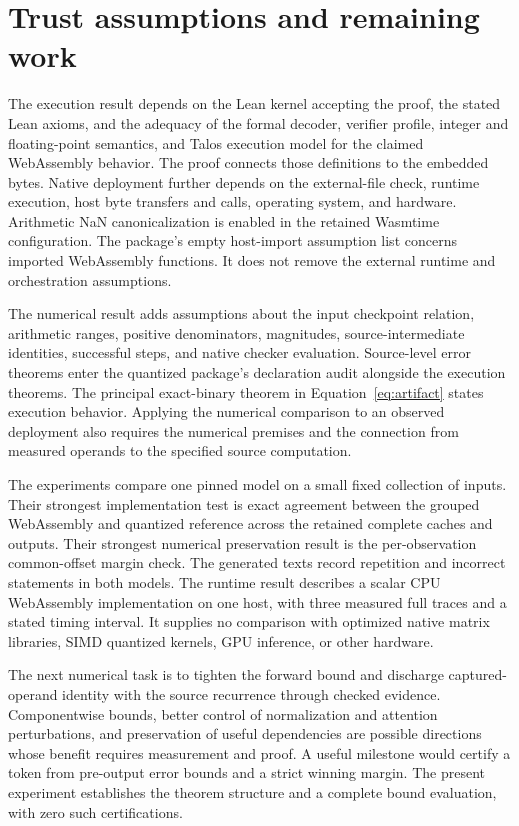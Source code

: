 \section{Trust assumptions and remaining work}
\label{sec:boundaries}

The execution result depends on the Lean kernel accepting the proof, the stated Lean axioms, and the adequacy of the formal decoder, verifier profile, integer and floating-point semantics, and Talos execution model for the claimed WebAssembly behavior.  The proof connects those definitions to the embedded bytes.  Native deployment further depends on the external-file check, runtime execution, host byte transfers and calls, operating system, and hardware.  Arithmetic NaN canonicalization is enabled in the retained Wasmtime configuration.  The package's empty host-import assumption list concerns imported WebAssembly functions.  It does not remove the external runtime and orchestration assumptions.

The numerical result adds assumptions about the input checkpoint relation, arithmetic ranges, positive denominators, magnitudes, source-intermediate identities, successful steps, and native checker evaluation.  Source-level error theorems enter the quantized package's declaration audit alongside the execution theorems.  The principal exact-binary theorem in Equation~\eqref{eq:artifact} states execution behavior.  Applying the numerical comparison to an observed deployment also requires the numerical premises and the connection from measured operands to the specified source computation.

The experiments compare one pinned model on a small fixed collection of inputs.  Their strongest implementation test is exact agreement between the grouped WebAssembly and quantized reference across the retained complete caches and outputs.  Their strongest numerical preservation result is the per-observation common-offset margin check.  The generated texts record repetition and incorrect statements in both models.  The runtime result describes a scalar CPU WebAssembly implementation on one host, with three measured full traces and a stated timing interval.  It supplies no comparison with optimized native matrix libraries, SIMD quantized kernels, GPU inference, or other hardware.

The next numerical task is to tighten the forward bound and discharge captured-operand identity with the source recurrence through checked evidence.  Componentwise bounds, better control of normalization and attention perturbations, and preservation of useful dependencies are possible directions whose benefit requires measurement and proof.  A useful milestone would certify a token from pre-output error bounds and a strict winning margin.  The present experiment establishes the theorem structure and a complete bound evaluation, with zero such certifications.

